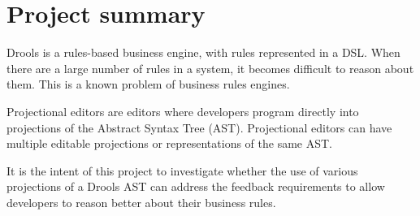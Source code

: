 \section{Project summary}

Drools is a rules-based business engine, with rules represented in a DSL.
When there are a large number of rules in a system, it becomes difficult to reason about them.
This is a known problem of business rules engines. 

Projectional editors are editors where developers program directly into projections of the Abstract Syntax Tree (AST).
Projectional editors can have multiple editable projections or representations of the same AST.
 
It is the intent of this project to investigate whether the use of various projections of a Drools AST can address the feedback requirements to allow developers to reason better about their business rules.